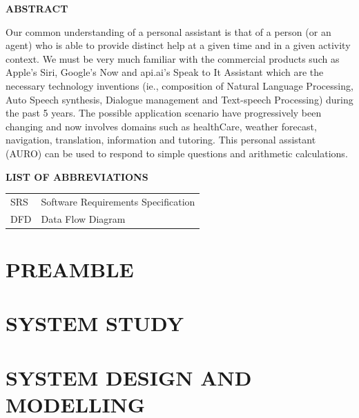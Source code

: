 \documentclass[11pt]{report}
\begin{document}
\newpage
\thispagestyle{empty}
\begin{center}
\Large \textbf{ABSTRACT}
\vspace{1cm}
\end{center}
Our common understanding of a personal assistant is that of a person (or an agent) who is able to provide distinct help at a given time and in a given activity context. We must be very much familiar with the commercial products such as Apple’s Siri, Google’s Now and api.ai’s Speak to It Assistant which are the necessary technology inventions (ie., composition of Natural Language Processing, Auto Speech synthesis, Dialogue management and Text-speech Processing) during the past 5 years. The possible application scenario have progressively been changing and now involves domains such as healthCare, weather forecast, navigation, translation, information and tutoring. This personal assistant (AURO) can be used to respond to simple questions and arithmetic calculations.

\tableofcontents
\thispagestyle{empty}

\listoffigures
\thispagestyle{empty}

\newpage
\thispagestyle{empty}
\begin{center}

\Large \textbf{LIST OF ABBREVIATIONS}

\vspace{1cm}

\begin{tabular}{l l}
SRS & Software Requirements Specification \\
DFD & Data Flow Diagram
\end{tabular}
\end{center}

\clearpage
\pagestyle{palin}
\setcounter{page}{1}
\chapter{PREAMBLE}



\chapter{SYSTEM STUDY}


\chapter{SYSTEM DESIGN AND MODELLING}

\end{document}

